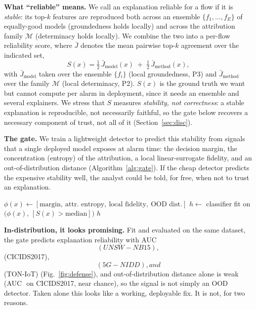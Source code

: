 \documentclass[conference]{IEEEtran}
\begin{document}
\textbf{What ``reliable'' means.} We call an explanation reliable for a flow if it is
\emph{stable}: its top-$k$ features are reproduced both across an ensemble
$\{f_1,\dots,f_E\}$ of equally-good models (groundedness holds locally) and across the attribution
family $\mathcal{M}$ (determinacy holds locally). We combine the two into a per-flow reliability
score, where $\bar{J}$ denotes the mean pairwise top-$k$ agreement over the indicated set,
\begin{equation}
S(x)=\tfrac{1}{2}\,\bar{J}_{\text{model}}(x)\;+\;\tfrac{1}{2}\,\bar{J}_{\text{method}}(x),
\label{eq:stab}
\end{equation}
with $\bar{J}_{\text{model}}$ taken over the ensemble $\{f_i\}$ (local groundedness, P3) and
$\bar{J}_{\text{method}}$ over the family $\mathcal{M}$ (local determinacy, P2).
$S(x)$ is the ground truth we want but cannot compute per alarm in deployment, since it needs an
ensemble and several explainers. We stress that $S$ measures \emph{stability, not correctness}: a
stable explanation is reproducible, not necessarily faithful, so the gate below recovers a
necessary component of trust, not all of it (Section~\ref{sec:disc}).

\textbf{The gate.} We train a lightweight detector to predict this stability from signals that a
single deployed model exposes at alarm time: the decision margin, the concentration (entropy) of
the attribution, a local linear-surrogate fidelity, and an out-of-distribution distance
(Algorithm~\ref{alg:gate}). If the cheap detector predicts the expensive stability well, the
analyst could be told, for free, when not to trust an explanation.

\begin{algorithm}[t]
\caption{The reliability gate (which we show does not deploy)}
\label{alg:gate}
$\phi(x)\gets[\text{margin},\ \text{attr.\ entropy},\ \text{local fidelity},\ \text{OOD dist.}]$\;
$h\gets$ classifier fit on $\big(\phi(x),\,[S(x)>\mathrm{median}]\big)$\;
\Return $h$ 
\end{algorithm}

\textbf{In-distribution, it looks promising.} Fit and evaluated on the same dataset, the gate
predicts explanation reliability with AUC $$ (UNSW-NB15),
$$ (CICIDS2017), $$ (5G-NIDD), and
$$ (TON-IoT)
(Fig.~\ref{fig:defense}), and out-of-distribution distance alone is weak (AUC
$$ on CICIDS2017, near chance), so the signal is not simply an OOD
detector. Taken alone this looks like a working, deployable fix. It is not, for two reasons.
\end{document}
